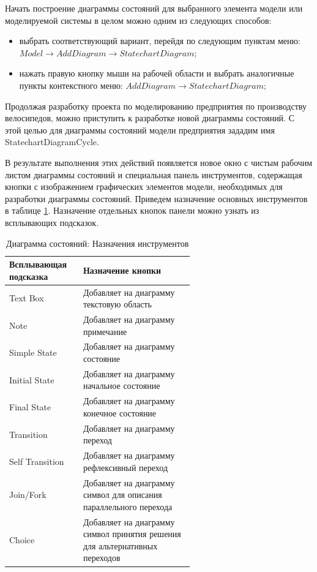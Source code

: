 \documentclass[a4paper,12pt]{extreport}
\begin{document}
Начать построение диаграммы состояний для выбранного элемента модели или моделируемой системы в целом можно одним из следующих способов:
\begin{itemize}
	\item выбрать соответствующий вариант, перейдя по следующим пунктам меню: \\$Model \to Add Diagram \to Statechart Diagram$;
	\item нажать правую кнопку мыши на рабочей области и выбрать аналогичные пункты контекстного меню: $Add Diagram \to Statechart Diagram$;
\end{itemize}

Продолжая разработку проекта по моделированию предприятия по производству велосипедов, можно приступить к разработке новой диаграммы состояний. С этой целью для диаграммы состояний модели предприятия зададим имя StatechartDiagramCycle.

В результате выполнения этих действий появляется новое окно с чистым рабочим листом диаграммы состояний и специальная панель инструментов, содержащая кнопки с изображением графических элементов модели, необходимых для разработки диаграммы состояний. Приведем назначение основных инструментов в таблице \ref{tab:toolboxstatechart}. Назначение отдельных кнопок панели можно узнать из всплывающих подсказок.

\begin{table}[h!]

	\begin{tabular}{|l|m{0.6\linewidth}|}
		\hline
		\textbf{Всплывающая подсказка} & \textbf{Назначение кнопки} \\ \hline
		Text Box & Добавляет на диаграмму текстовую область \\ \hline
		Note & Добавляет на диаграмму примечание \\ \hline
		Simple State & Добавляет на диаграмму состояние \\ \hline
		Initial State & Добавляет на диаграмму начальное состояние \\ \hline
		Final State & Добавляет на диаграмму конечное состояние \\ \hline
		Transition & Добавляет на диаграмму переход \\ \hline
		Self Transition & Добавляет на диаграмму рефлексивный переход \\ \hline
		Join/Fork & Добавляет на диаграмму символ для описания параллельного перехода \\ \hline
		Choice & Добавляет на диаграмму символ принятия решения для альтернативных переходов \\ \hline
	\end{tabular}
	\caption{Диаграмма состояний: Назначения инструментов}
	\label{tab:toolboxstatechart}
\end{table}
\end{document}
